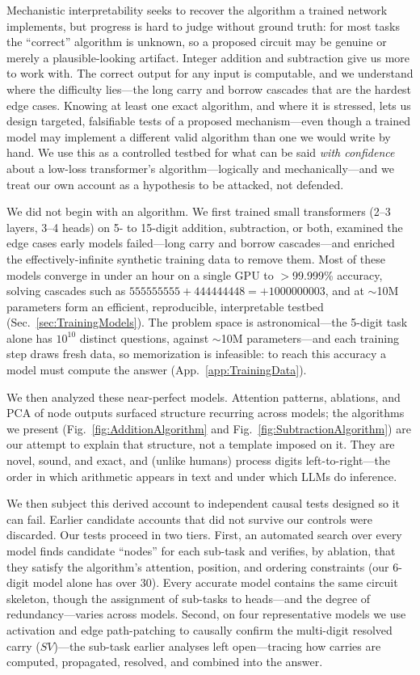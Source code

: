 \documentclass[11pt]{article}
\begin{document}
Mechanistic interpretability seeks to recover the algorithm a trained network implements, but progress is hard to judge without ground
truth: for most tasks the ``correct'' algorithm is unknown, so a proposed circuit may be genuine or merely a plausible-looking artifact.
Integer addition and subtraction give us more to work with. The correct output for any input is computable, and we understand where the
difficulty lies---the long carry and borrow cascades that are the hardest edge cases. Knowing at least one exact algorithm, and where it is
stressed, lets us design targeted, falsifiable tests of a proposed mechanism---even though a trained model may implement a different valid
algorithm than one we would write by hand. We use this as a controlled testbed for what can be said \emph{with confidence} about a low-loss
transformer's algorithm---logically and mechanically---and we treat our own account as a hypothesis to be attacked, not defended.

We did not begin with an algorithm. We first trained small transformers (2--3 layers, 3--4 heads) on 5- to 15-digit addition, subtraction,
or both, examined the edge cases early models failed---long carry and borrow cascades---and enriched the effectively-infinite synthetic
training data to remove them. Most of these models converge in under an hour on a single GPU to $>$99.999\% accuracy, solving cascades such
as $555555555+444444448=+1000000003$, and at $\sim$10M parameters form an efficient, reproducible, interpretable testbed
(Sec.~\ref{sec:TrainingModels}). The problem space is astronomical---the 5-digit task alone has $10^{10}$ distinct
questions, against $\sim$10M parameters---and each training step draws fresh data, so memorization is
infeasible: to reach this accuracy a model must compute the answer (App.~\ref{app:TrainingData}).

We then analyzed these near-perfect models. Attention patterns, ablations, and PCA of node outputs surfaced structure recurring
across models; the algorithms we present (Fig.~\ref{fig:AdditionAlgorithm} and Fig.~\ref{fig:SubtractionAlgorithm}) are our attempt to explain
that structure, not a template imposed on it. They are novel, sound, and exact, and (unlike humans) process digits left-to-right---the order
in which arithmetic appears in text and under which LLMs do inference.

We then subject this derived account to independent causal tests designed so it can fail. Earlier candidate accounts that did not survive
our controls were discarded.
Our tests proceed in two tiers. First, an automated search over every model finds candidate ``nodes'' for each sub-task and verifies, by
ablation, that they satisfy the algorithm's attention, position, and ordering constraints (our 6-digit model alone has over 30). Every
accurate model contains the same circuit skeleton, though the assignment of sub-tasks to heads---and the degree of redundancy---varies
across models. Second, on four representative models we use activation and edge path-patching to causally confirm the multi-digit resolved
carry ($SV$)---the sub-task earlier analyses left open---tracing how carries are computed, propagated, resolved, and combined into the answer.
\end{document}
